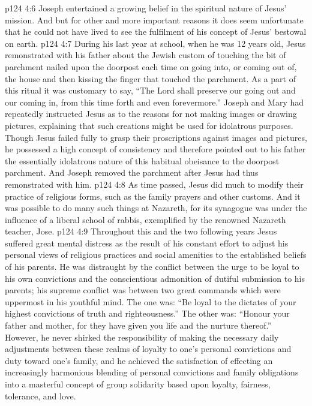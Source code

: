 \vs p124 4:6 Joseph entertained a growing belief in the spiritual nature of Jesus’ mission. And but for other and more important reasons it does seem unfortunate that he could not have lived to see the fulfilment of his concept of Jesus’ bestowal on earth.
\vs p124 4:7 \pc During his last year at school, when he was 12 years old, Jesus remonstrated with his father about the Jewish custom of touching the bit of parchment nailed upon the doorpost each time on going into, or coming out of, the house and then kissing the finger that touched the parchment. As a part of this ritual it was customary to say, “The Lord shall preserve our going out and our coming in, from this time forth and even forevermore.” Joseph and Mary had repeatedly instructed Jesus as to the reasons for not making images or drawing pictures, explaining that such creations might be used for idolatrous purposes. Though Jesus failed fully to grasp their proscriptions against images and pictures, he possessed a high concept of consistency and therefore pointed out to his father the essentially idolatrous nature of this habitual obeisance to the doorpost parchment. And Joseph removed the parchment after Jesus had thus remonstrated with him.
\vs p124 4:8 As time passed, Jesus did much to modify their practice of religious forms, such as the family prayers and other customs. And it was possible to do many such things at Nazareth, for its synagogue was under the influence of a liberal school of rabbis, exemplified by the renowned Nazareth teacher, Jose.
\vs p124 4:9 Throughout this and the two following years Jesus suffered great mental distress as the result of his constant effort to adjust his personal views of religious practices and social amenities to the established beliefs of his parents. He was distraught by the conflict between the urge to be loyal to his own convictions and the conscientious admonition of dutiful submission to his parents; his supreme conflict was between two great commands which were uppermost in his youthful mind. The one was: “Be loyal to the dictates of your highest convictions of truth and righteousness.” The other was: “Honour your father and mother, for they have given you life and the nurture thereof.” However, he never shirked the responsibility of making the necessary daily adjustments between these realms of loyalty to one’s personal convictions and duty toward one’s family, and he achieved the satisfaction of effecting an increasingly harmonious blending of personal convictions and family obligations into a masterful concept of group solidarity based upon loyalty, fairness, tolerance, and love.
